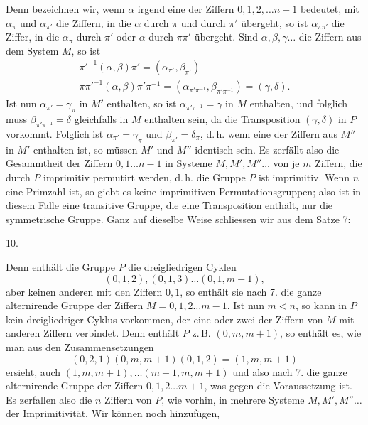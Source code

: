 Denn bezeichnen wir, wenn $\alpha$ irgend eine der Ziffern
$0, 1, 2, \ldots n - 1$ bedeutet, mit $\alpha_\pi$ und $\alpha_{\pi'}$ die Ziffern, in die $\alpha$
durch $\pi$ und durch $\pi'$ übergeht, so ist $\alpha_{\pi\pi'}$ die Ziffer, in die $\alpha_\pi$
durch $\pi'$ oder $\alpha$ durch $\pi\pi'$ übergeht. Sind $\alpha, \beta, \gamma \ldots$ die Ziffern
aus dem System $M$, so ist
\[
\begin{gathered}
\pi'^{-1}(\alpha, \beta) \pi' = (\alpha_{\pi'}, \beta_{\pi'}) \\
\pi\pi'^{-1}(\alpha, \beta) \pi'\pi^{-1} = (\alpha_{\pi'\pi^{-1}}, \beta_{\pi'\pi^{-1}}) = (\gamma, \delta).
\end{gathered}
\]
Ist nun $\alpha_{\pi'} = \gamma_\pi$ in $M'$ enthalten, so ist $\alpha_{\pi'\pi^{-1}} = \gamma$ in $M$
enthalten, und folglich muss $\beta_{\pi'\pi^{-1}} = \delta$ gleichfalls in $M$ enthalten sein,
da die Transposition $(\gamma, \delta)$ in $P$ vorkommt. Folglich ist $\alpha_{\pi'} = \gamma_\pi$
und $\beta_{\pi'} = \delta_\pi$, d.\,h. wenn eine der Ziffern aus $M''$ in $M'$ enthalten ist, so
müssen $M'$ und $M''$ identisch sein.
Es zerfällt also die Gesammtheit der Ziffern $0, 1 \ldots n - 1$
in Systeme $M, M', M'' \ldots$ von je $m$ Ziffern, die durch $P$ imprimitiv permutirt
werden, d.\,h. die Gruppe $P$ ist imprimitiv.
Wenn $n$ eine Primzahl ist, so giebt es keine imprimitiven Permutationsgruppen;
also ist in diesem Falle eine transitive Gruppe, die eine Transposition enthält,
nur die symmetrische Gruppe.
Ganz auf dieselbe Weise schliessen wir aus dem Satze 7:

10. 

Denn enthält die Gruppe $P$ die dreigliedrigen Cyklen
\[
(0, 1, 2), (0, 1, 3) \ldots (0, 1, m - 1),
\]
aber keinen anderen mit den Ziffern $0, 1$, so enthält sie nach 7.
die ganze alternirende Gruppe der Ziffern $M = 0, 1, 2 \ldots m - 1$.
Ist nun $m < n$, so kann in $P$ kein dreigliedriger Cyklus vorkommen, der eine
oder zwei der Ziffern von $M$ mit anderen Ziffern verbindet. Denn enthält $P$
z.\,B. $(0, m, m + 1)$, so enthält es, wie man aus den Zusammensetzungen
\[
(0, 2, 1) (0, m, m + 1) (0, 1, 2) = (1, m, m + 1)
\]
ersieht, auch $(1, m, m + 1), \ldots (m - 1, m, m + 1)$ und also
nach 7. die ganze alternirende Gruppe der Ziffern $0, 1, 2 \ldots m + 1$,
was gegen die Voraussetzung ist. Es zerfallen also die $n$ Ziffern
von $P$, wie vorhin, in mehrere Systeme $M, M', M'' \ldots$ der Imprimitivität. Wir können noch hinzufügen,
